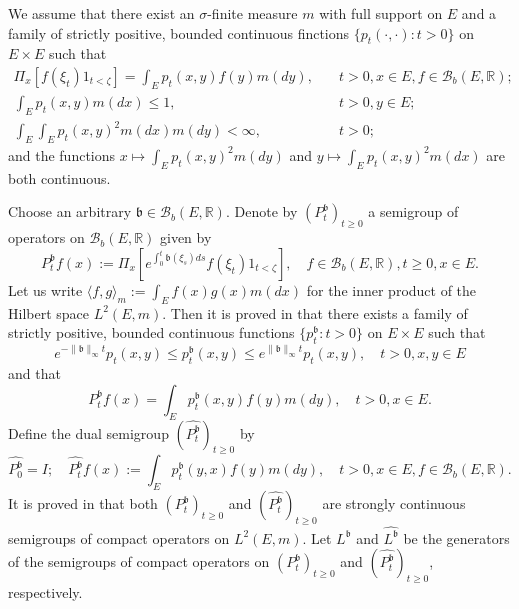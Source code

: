 \documentclass[12pt,a4paper]{amsart}
\numberwithin{equation}{section}
\theoremstyle{plain}
\theoremstyle{definition}
\theoremstyle{remark}
\begin{document}
	We assume  that there exist an $\sigma$-finite measure $m$ with full support on $E$ and a family of strictly positive, bounded continuous finctions $\{p_t(\cdot,\cdot): t>0\}$ on $E\times E$ such that
\begin{align}
	\Pi_x[f(\xi_t) 1_{t< \zeta}] = \int_E p_t(x,y) f(y)m(dy), & \quad t>0, x\in E, f\in \mathcal B_b(E,\mathbb R);
	\\ \int_E p_t(x,y) m(dx) \leq 1, &\quad t>0, y\in E;
	\\ \int_E \int_E p_t(x,y)^2 m(dx)m(dy) < \infty, &\quad t>0;
\end{align}
	and the functions $x \mapsto \int_E p_t(x,y)^2m(dy)$ and $y\mapsto \int_E p_t(x,y)^2m(dx)$ are both continuous.

	Choose an arbitrary $ \mathfrak b\in \mathcal B_b(E,\mathbb R)$.
	Denote by $(P_t^\mathfrak b)_{t\geq 0}$ a semigroup of operators on $\mathcal B_b(E,\mathbb R)$ given by
\begin{equation}
	P_t^\mathfrak b f(x)
	:= \Pi_x[e^{\int_0^t \mathfrak b(\xi_s)ds} f(\xi_t) 1_{t< \zeta}],
	\quad f\in \mathcal B_b(E, \mathbb R), t\geq 0, x\in E.
\end{equation}
	Let us write $\langle f,g \rangle_m:= \int_E f(x)g(x) m(dx)$ for  the inner product of the Hilbert space $L^2(E,m)$.
	Then it is proved in \cite{RenSongZhang2015Limit, RenSongZhang2017Central} that there exists a family of strictly positive, bounded continuous functions $\{p_t^\mathfrak b: t> 0\}$ on $E\times E$ such that
\begin{equation} \label{eq:IU.0}
	e^{-\|\mathfrak b\|_\infty t} p_t(x,y)
	\leq p_t^\mathfrak b(x,y) \leq e^{\|\mathfrak b\|_\infty t}p_t(x,y),
	\quad t>0, x,y\in E
\end{equation}
	and that
\begin{equation}
	P_t^\mathfrak b f(x)
	= \int_E p_t^\mathfrak b(x,y) f(y) m(dy),
	\quad t>0, x\in E.
\end{equation}
	Define the dual semigroup $(\widehat {P^{\mathfrak b}_t} )_{t\geq 0}$ by
\begin{equation}
	\widehat {P_0^{\mathfrak b}}
	= I;
	\quad \widehat {P_t^{\mathfrak b}} f(x)
	:= \int_E p_t^\mathfrak b(y,x) f(y) m(dy),
	\quad t>0,x\in E, f\in \mathcal B_b(E,\mathbb R).
\end{equation}
	It is proved in \cite{RenSongZhang2015Limit, RenSongZhang2017Central} that both $(P_t^\mathfrak b)_{t\geq 0}$ and $(\widehat {P_t^\mathfrak b})_{t\geq 0}$ are strongly continuous semigroups of compact operators on $L^2(E,m)$.	
	Let $L^\mathfrak b$ and $\widehat {L^\mathfrak b}$ be the generators of the semigroups of compact operators on $(P_t^\mathfrak b)_{t\geq 0}$ and $(\widehat {P_t^\mathfrak b})_{t\geq 0}$, respectively.
\end{document}
